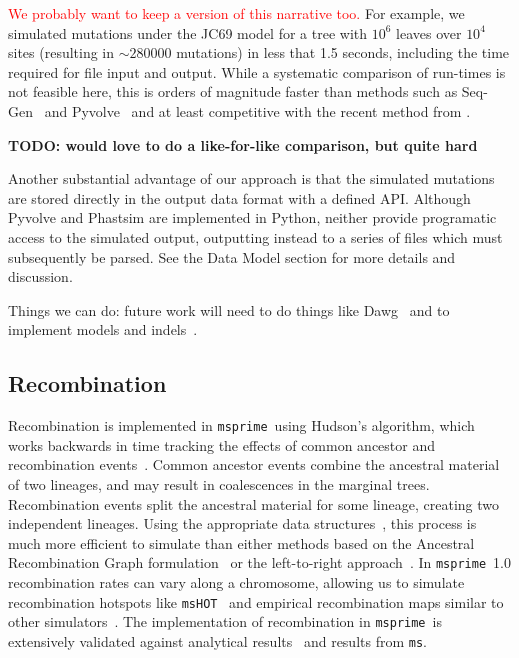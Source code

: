 \documentclass{article}
\newcommand{\msprime}[0]{\texttt{msprime}}
\newcommand{\ms}[0]{\texttt{ms}}
\newcommand{\jkcomment}[1]{\textcolor{red}{#1}}
\begin{document}
\jkcomment{We probably want to keep a version of this narrative too.}
For example, we simulated mutations under the JC69
model for a tree with $10^6$ leaves over $10^4$ sites (resulting
in $\sim 280000$ mutations) in less that 1.5 seconds, including
the time required for file input and output. While a systematic
comparison of run-times is not feasible here, this is orders
of magnitude faster than methods such as
Seq-Gen~\citep{rambaut1997seq} and
Pyvolve~\citep{spielman2015pyvolve}
and at least competitive with the recent method from
\cite{demaio2021phastsim}.

\textbf{TODO: would love to do a like-for-like comparison, but quite hard}

Another substantial advantage of our approach is that the simulated
mutations are stored directly in the output data format with
a defined API. Although
Pyvolve and Phastsim are implemented in Python, neither provide
programatic access to the simulated output, outputting instead
to a series of files which must subsequently be parsed.
See the Data Model section for more details and discussion.

Things we can do: future work will need to do things like
Dawg~\citep{cartwright2005dna} and to implement models and
indels~\citep{fletcher2009indelible}.

\subsection*{Recombination}

Recombination is implemented in \msprime\ using Hudson's algorithm, which
works backwards in time tracking the
effects of common ancestor and recombination
events~\citep{hudson1983properties,hudson1990gene,kelleher2016efficient}.
Common ancestor events combine the ancestral material of two lineages, and may
result in coalescences in the marginal trees. Recombination events
split the ancestral material for some lineage, creating two independent
lineages. Using the appropriate data structures~\citep{kelleher2016efficient},
this process is much more efficient to simulate than either
methods based on the Ancestral Recombination Graph
formulation~\citep{griffiths1991two,griffiths1997ancestral}
or the left-to-right approach~\citep{wiuf1999recombination,wiuf1999ancestry}.
In \msprime\ 1.0 recombination rates can vary along a chromosome, allowing
us to simulate recombination hotspots like \texttt{msHOT}~\citep{hellenthal2007mshot}
and empirical recombination maps similar to other
simulators~\citep[e.g.][]{shlyakhter2014cosi2}.
The implementation of recombination in \msprime\ is extensively validated
against analytical results~\citep{hudson1983properties,kaplan1985use}
and results from \ms.
\end{document}
